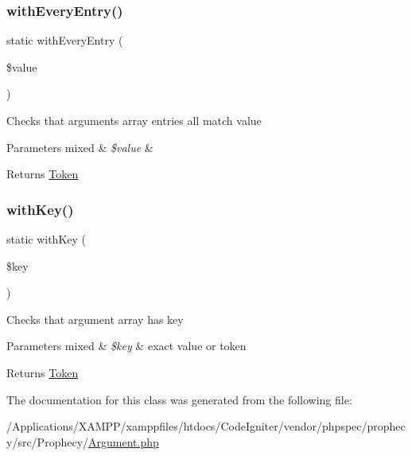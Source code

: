 \subsubsection{\texorpdfstring{with\+Every\+Entry()}{withEveryEntry()}}
{\footnotesize\ttfamily static with\+Every\+Entry (\begin{DoxyParamCaption}\item[{}]{\$value }\end{DoxyParamCaption})\hspace{0.3cm}{\ttfamily [static]}}

Checks that arguments array entries all match value


\begin{DoxyParams}[1]{Parameters}
mixed & {\em \$value} & \\
\hline
\end{DoxyParams}
\begin{DoxyReturn}{Returns}
\mbox{\hyperlink{namespace_prophecy_1_1_argument_1_1_token}{Token}} 
\end{DoxyReturn}
\mbox{\label{class_prophecy_1_1_argument_a574bf7d3db2beab5c408889345ac9656}} 
\subsubsection{\texorpdfstring{with\+Key()}{withKey()}}
{\footnotesize\ttfamily static with\+Key (\begin{DoxyParamCaption}\item[{}]{\$key }\end{DoxyParamCaption})\hspace{0.3cm}{\ttfamily [static]}}

Checks that argument array has key


\begin{DoxyParams}[1]{Parameters}
mixed & {\em \$key} & exact value or token\\
\hline
\end{DoxyParams}
\begin{DoxyReturn}{Returns}
\mbox{\hyperlink{namespace_prophecy_1_1_argument_1_1_token}{Token}} 
\end{DoxyReturn}


The documentation for this class was generated from the following file\+:\begin{DoxyCompactItemize}
\item 
/\+Applications/\+X\+A\+M\+P\+P/xamppfiles/htdocs/\+Code\+Igniter/vendor/phpspec/prophecy/src/\+Prophecy/\mbox{\hyperlink{_argument_8php}{Argument.\+php}}\end{DoxyCompactItemize}
